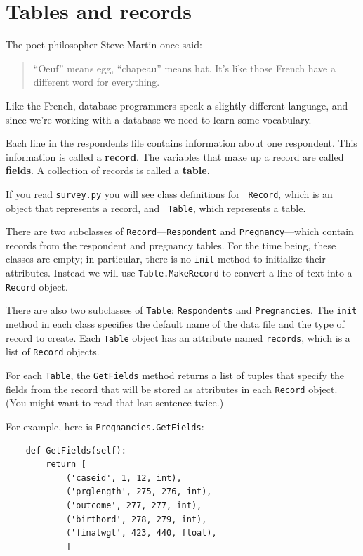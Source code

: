 \documentclass[12pt]{book}
\begin{document}
\section{Tables and records}

The poet-philosopher Steve Martin once said:

\begin{quote}
``Oeuf'' means egg, ``chapeau'' means hat.  It's like those French
  have a different word for everything.
\end{quote}

Like the French, database programmers speak a slightly
different language, and since we're working with a database we need
to learn some vocabulary.


Each line in the respondents file contains information about one
respondent.  This information is called a {\bf record}.  The
variables that make up a record are called {\bf fields}.  A
collection of records is called a {\bf table}.


If you read {\tt survey.py} you will see class definitions for {\tt
  Record}, which is an object that represents a record, and {\tt
  Table}, which represents a table.

There are two subclasses of
{\tt Record}---{\tt Respondent} and {\tt Pregnancy}---which
contain records from the respondent and pregnancy tables.
For the time being, these classes are empty; in particular, there
is no {\tt init} method to initialize their attributes.  Instead
we will use {\tt Table.MakeRecord} to convert a line of text into
a {\tt Record} object.

There are also two subclasses of {\tt Table}: {\tt Respondents}
and {\tt Pregnancies}.  The {\tt init} method in each class
specifies the default name of the data file and the type of
record to create.  Each {\tt Table} object has an attribute
named {\tt records}, which is a list of {\tt Record} objects.

For each {\tt Table}, the {\tt GetFields} method returns
a list of tuples that specify the fields from the record that
will be stored as attributes in each {\tt Record} object.  (You
might want to read that last sentence twice.)

For example, here is {\tt Pregnancies.GetFields}:

\begin{verbatim}
    def GetFields(self):
        return [
            ('caseid', 1, 12, int),
            ('prglength', 275, 276, int),
            ('outcome', 277, 277, int),
            ('birthord', 278, 279, int),
            ('finalwgt', 423, 440, float),
            ]
\end{verbatim}
\end{document}
